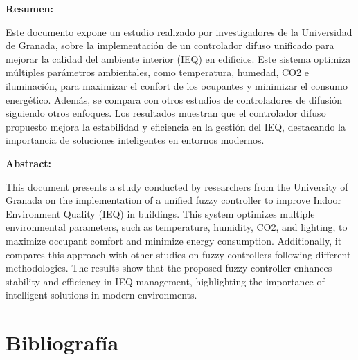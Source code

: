 \documentclass[12pt]{article}
\begin{document}
\newpage
\justifying


\textbf{Resumen:}

Este documento expone un estudio realizado por investigadores de la Universidad de Granada, sobre la implementación de un controlador difuso unificado para mejorar la calidad del ambiente interior (IEQ) en edificios. Este sistema optimiza múltiples parámetros ambientales, como temperatura, humedad, CO2 e iluminación, para maximizar el confort de los ocupantes y minimizar el consumo energético. Además, se compara con otros estudios de controladores de difusión siguiendo otros enfoques. Los resultados muestran que el controlador difuso propuesto mejora la estabilidad y eficiencia en la gestión del IEQ, destacando la importancia de soluciones inteligentes en entornos modernos.

\vline

\textbf{Abstract:}

This document presents a study conducted by researchers from the University of Granada on the implementation of a unified fuzzy controller to improve Indoor Environment Quality (IEQ) in buildings. This system optimizes multiple environmental parameters, such as temperature, humidity, CO2, and lighting, to maximize occupant comfort and minimize energy consumption. Additionally, it compares this approach with other studies on fuzzy controllers following different methodologies. The results show that the proposed fuzzy controller enhances stability and efficiency in IEQ management, highlighting the importance of intelligent solutions in modern environments.

\newpage
\tableofcontents

\newpage
\listoffigures

\newpage
\listoftables

\newpage



\newpage


\newpage


\newpage


\newpage


\newpage
\section{Bibliografía}
\renewcommand{\bibitemsep}{1em}
\printbibliography[heading=empty]
\end{document}
